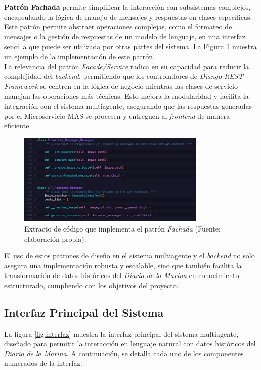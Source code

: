 \textbf{Patrón Fachada} permite simplificar la interacción con subsistemas complejos, encapsulando la lógica de manejo de mensajes y respuestas en clases específicas. Este patrón permite abstraer operaciones complejas, como el formateo de mensajes o la gestión de respuestas de un modelo de lenguaje, en una interfaz sencilla que puede ser utilizada por otras partes del sistema. La Figura \ref{fig:codigo_facade} muestra un ejemplo de la implementación de este patrón.\\
La relevancia del patrón \textit{Facade/Service} radica en su capacidad para reducir la complejidad del \textit{backend}, permitiendo que los controladores de \textit{Django REST Framework} se centren en la lógica de negocio mientras las clases de servicio manejan las operaciones más técnicas. Esto mejora la modularidad y facilita la integración con el sistema multiagente, asegurando que las respuestas generadas por el Microservicio MAS se procesen y entreguen al \textit{frontend} de manera eficiente.

\begin{figure}[htbp]
	\centering
	\includegraphics[width=0.8\textwidth]{images/fachada.PNG}
	\caption{Extracto de código que implementa el patrón \textit{Fachada} (Fuente: elaboración propia).}
	\label{fig:codigo_facade}
\end{figure}

El uso de estos patrones de diseño en el sistema multiagente y el \textit{backend} no solo asegura una implementación robusta y escalable, sino que también facilita la transformación de datos históricos del \textit{Diario de la Marina} en conocimiento estructurado, cumpliendo con los objetivos del proyecto.



\subsection{Interfaz Principal del Sistema}

La figura \ref{fig:interfaz} muestra la interfaz principal del sistema multiagente, diseñado para permitir la interacción en lenguaje natural con datos históricos del \textit{Diario de la Marina}. A continuación, se detalla cada uno de los componentes numerados de la interfaz:

